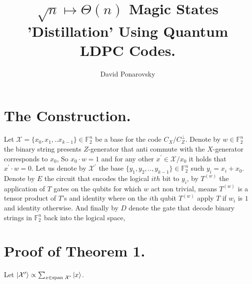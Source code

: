 \documentclass[manuscript,screen,review]{acmart}
\begin{document}

\title{ $\sqrt{n} \mapsto \Theta(n)$  Magic States 'Distillation' Using
Quantum LDPC Codes. }
\author{David Ponarovsky}
\maketitle

\newcommand*{\Mbas}{\mathcal{X}^\prime}

\section{The Construction.}

Let $\mathcal{X} = \{x_{0}, x_{1}, .. x_{k-1}\} \in \mathbb{F}_{2}^{n}$ be a
base for the code $C_{X}/C_{Z}^\perp$.  Denote by $w \in \mathbb{F}_{2}^{n}$
the binary string presents $Z$-generator that anti commute with the
$X$-generator corresponds to $x_{0}$, So $x_{0}\cdot w = 1$ and for any other
$x^\prime \in \mathcal{X}/x_{0}$ it holds that $x^{\prime}\cdot w = 0 $. Let
us denote by $\Mbas$ the base $\{ y_{1}, y_{2}, .., y_{k-1} \} \in
\mathbb{F}_{2}^{n}$ such $y_{i}= x_{i} + x_{0}$. Denote by $E$ the circuit
that encodes the logical $ith$ bit to $y_{i}$, by $T^{(w)}$ the application of
$T$ gates on the qubits for which $w$ act non trivial, means $T^{(w)}$ is a
tensor product of $T$'s and identity where on the $i$th qubit $T^{(w)}$ apply
$T$ if $w_{i}$ is $1$ and identity otherwise. And finally by $D$ denote the gate that decode binary strings in $\mathbb{F}_{2}^{n}$ back into the logical space, 


\section{Proof of Theorem 1.}

\begin{claim}
  Let $\ket{\Mbas} \propto \sum_{x \in \text{span } \Mbas }{\ket{x}}$.
\end{claim}





%

\printbibliography
\end{document}
